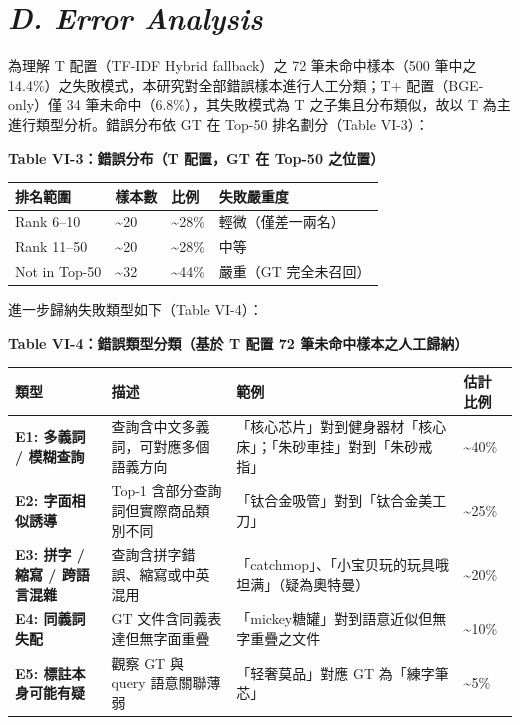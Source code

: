 \section{\texorpdfstring{\emph{D. Error Analysis}}{D. Error Analysis}}\label{d.-error-analysis}

為理解 T 配置（TF-IDF Hybrid fallback）之 72 筆未命中樣本（500 筆中之 14.4\%）之失敗模式，本研究對全部錯誤樣本進行人工分類；T+
配置（BGE-only）僅 34 筆未命中（6.8\%），其失敗模式為 T 之子集且分布類似，故以 T 為主進行類型分析。錯誤分布依
GT 在 Top-50 排名劃分（Table VI-3）：

\textbf{Table VI-3：錯誤分布（T 配置，GT 在 Top-50 之位置）}

\begin{longtable}[]{@{}llll@{}}
\toprule\noalign{}
排名範圍 & 樣本數 & 比例 & 失敗嚴重度 \\
\midrule\noalign{}
\endhead
\bottomrule\noalign{}
\endlastfoot
Rank 6--10 & \textasciitilde20 & \textasciitilde28\% & 輕微（僅差一兩名） \\
Rank 11--50 & \textasciitilde20 & \textasciitilde28\% & 中等 \\
Not in Top-50 & \textasciitilde32 & \textasciitilde44\% & 嚴重（GT 完全未召回） \\
\end{longtable}

進一步歸納失敗類型如下（Table VI-4）：

\textbf{Table VI-4：錯誤類型分類（基於 T 配置 72 筆未命中樣本之人工歸納）}

\begin{longtable}[]{@{}p{}p{}p{}p{}@{}}
\toprule\noalign{}
類型 & 描述 & 範例 & 估計比例 \\
\midrule\noalign{}
\endhead
\bottomrule\noalign{}
\endlastfoot
\textbf{E1: 多義詞 / 模糊查詢} & 查詢含中文多義詞，可對應多個語義方向 & 「核心芯片」對到健身器材「核心床」；「朱砂車挂」對到「朱砂戒指」 & \textasciitilde40\% \\
\textbf{E2: 字面相似誘導} & Top-1 含部分查詢詞但實際商品類別不同 & 「钛合金吸管」對到「钛合金美工刀」 & \textasciitilde25\% \\
\textbf{E3: 拼字 / 縮寫 / 跨語言混雜} & 查詢含拼字錯誤、縮寫或中英混用 & 「catchmop」、「小宝贝玩的玩具哦坦满」（疑為奧特曼） & \textasciitilde20\% \\
\textbf{E4: 同義詞失配} & GT 文件含同義表達但無字面重疊 & 「mickey糖罐」對到語意近似但無字重疊之文件 & \textasciitilde10\% \\
\textbf{E5: 標註本身可能有疑} & 觀察 GT 與 query 語意關聯薄弱 & 「轻奢莫品」對應 GT 為「練字筆芯」 & \textasciitilde5\% \\
\end{longtable}

